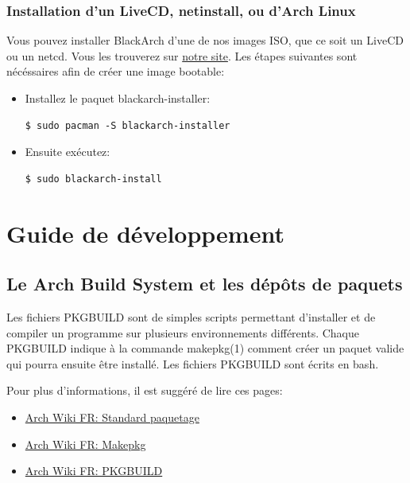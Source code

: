 \documentclass[a4paper, oneside, 11pt]{book}
\begin{document}
\subsection{Installation d'un LiveCD, netinstall, ou d'Arch Linux}
Vous pouvez installer BlackArch d'une de nos images ISO, que ce soit un LiveCD
ou un netcd. Vous les trouverez sur
\href{http://www.blackarch.org/download.html#iso}{notre site}. Les étapes
suivantes sont nécéssaires afin de créer une image bootable:
\begin{itemize}
\item Installez le paquet blackarch-installer:
{\small
\color{gray}
\begin{verbatim}
$ sudo pacman -S blackarch-installer
\end{verbatim}
}
\item Ensuite exécutez:
{\small
\color{gray}
\begin{verbatim}
$ sudo blackarch-install
\end{verbatim}
}
\end{itemize}



\chapter{Guide de développement}

\section{Le Arch Build System et les dépôts de paquets}

Les fichiers PKGBUILD sont de simples scripts permettant d'installer et de
compiler un programme sur plusieurs environnements différents.
Chaque PKGBUILD indique à la commande makepkg(1) comment créer un paquet valide
qui pourra ensuite être installé. Les fichiers PKGBUILD sont écrits en bash.

Pour plus d'informations, il est suggéré de lire ces pages:
\begin{itemize}
\item \href{http://wiki.archlinux.fr/Standard_paquetage}{Arch Wiki FR:
Standard paquetage}
\item \href{http://wiki.archlinux.fr/Makepkg}{Arch Wiki FR: Makepkg}
\item \href{http://wiki.archlinux.fr/PKGBUILD}{Arch Wiki FR: PKGBUILD}
\end{itemize}
\end{document}
